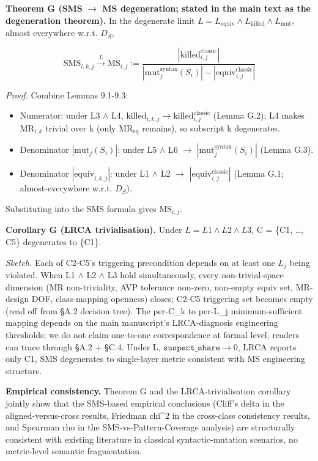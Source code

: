 \documentclass[manuscript,screen,review]{acmart}
\begin{document}
\textbf{Theorem G (SMS $\to$ MS degeneration; stated in the main text
as the degeneration theorem).} In the degenerate limit
$L = L_{\mathrm{equiv}} \wedge L_{\mathrm{killed}} \wedge L_{\mathrm{mut}}$, almost everywhere
w.r.t. $D_S$,

\[ \mathrm{SMS}_{i,k,j} \xrightarrow{L} \mathrm{MS}_{i,j} := \frac{|\mathrm{killed}_{i,j}^{\mathrm{classic}}|}{|\mathrm{mut}_j^{\mathrm{syntax}}(S_i)| - |\mathrm{equiv}_{i,j}^{\mathrm{classic}}|} \]

\emph{Proof.} Combine Lemmas 9.1-9.3:

\begin{itemize}

\item
  Numerator: under L3 $\wedge$ L4, $\mathrm{killed}_{i,k,j} \to
  \mathrm{killed}_{i,j}^{\mathrm{classic}}$ (Lemma G.2); L4 makes $\mathrm{MR}_{i,k}$ trivial
  over k (only $\mathrm{MR}_{\mathrm{eq}}$ remains), so subscript k degenerates.
\item
  Denominator $|\mathrm{mut}_j(S_i)|$: under L5 $\wedge$ L6 $\to$
  $|\mathrm{mut}_j^{\mathrm{syntax}}(S_i)|$ (Lemma G.3).
\item
  Denominator $|\mathrm{equiv}_{i,k,j}|$: under L1 $\wedge$ L2 $\to$
  $|\mathrm{equiv}_{i,j}^{\mathrm{classic}}|$ (Lemma G.1;
  almost-everywhere w.r.t. $D_S$).
\end{itemize}

Substituting into the SMS formula gives $\mathrm{MS}_{i,j}$.

\textbf{Corollary G (LRCA trivialisation).} Under $L = L1 \wedge L2 \wedge L3$, C
= \{C1, \ldots, C5\} degenerates to \{C1\}.

\emph{Sketch.} Each of C2-C5's triggering precondition depends on at
least one $L_j$ being violated. When L1 $\wedge$ L2 $\wedge$ L3 hold simultaneously,
every non-trivial-space dimension (MR non-triviality, AVP tolerance
non-zero, non-empty equiv set, MR-design DOF, class-mapping openness)
closes; C2-C5 triggering set becomes empty (read off from §A.2 decision
tree). The per-C\_k to per-L\_j minimum-sufficient mapping depends on
the main manuscript's LRCA-diagnosis engineering thresholds; we do not claim one-to-one
correspondence at formal level, readers can trace through §A.2 + §C.4.
Under L, $\texttt{suspect\_share} \to 0$, LRCA reports only C1, SMS degenerates to
single-layer metric consistent with \citet{d7c38286734419b52de4262c9802ebdfcf4b9447} MS engineering
structure.

\textbf{Empirical consistency.} Theorem G and the LRCA-trivialisation
corollary jointly
show that the SMS-based empirical conclusions (Cliff's delta in the aligned-versus-cross results,
Friedman chi\^{}2 in the cross-class consistency results, and Spearman rho in the SMS-vs-Pattern-Coverage analysis) are structurally consistent
with existing \citet{d7c38286734419b52de4262c9802ebdfcf4b9447} literature in classical
syntactic-mutation scenarios, no metric-level semantic fragmentation.
\end{document}
